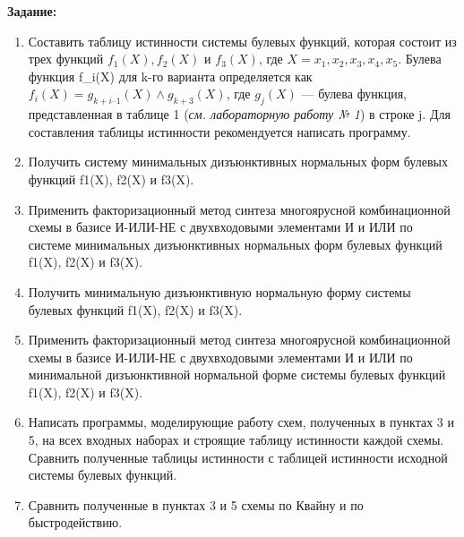 \textbf{Задание:}

\begin{enumerate}
\def\labelenumi{\arabic{enumi}.}
\tightlist
\item
  Составить таблицу истинности системы булевых функций, которая состоит
  из трех функций \(f_1(X), f_2(X)\) и \(f_3(X)\), где
  \(X = {x_1, x_2, x_3, x_4, x_5}\). Булева функция f\_i(X) для k-го
  варианта определяется как \(f_i(X) = g_{k+i–1}(X) \land g_{k+3}(X)\),
  где \(g_j(X)\) --- булева функция, представленная в таблице 1
  (\emph{см. лабораторную работу № 1}) в строке j. Для составления
  таблицы истинности рекомендуется написать программу.
\item
  Получить систему минимальных дизъюнктивных нормальных форм булевых
  функций f1(X), f2(X) и f3(X).
\item
  Применить факторизационный метод синтеза многоярусной комбинационной
  схемы в базисе И-ИЛИ-НЕ с двухвходовыми элементами И и ИЛИ по системе
  минимальных дизъюнктивных нормальных форм булевых функций f1(X), f2(X)
  и f3(X).
\item
  Получить минимальную дизъюнктивную нормальную форму системы булевых
  функций f1(X), f2(X) и f3(X).
\item
  Применить факторизационный метод синтеза многоярусной комбинационной
  схемы в базисе И-ИЛИ-НЕ с двухвходовыми элементами И и ИЛИ по
  минимальной дизъюнктивной нормальной форме системы булевых функций
  f1(X), f2(X) и f3(X).
\item
  Написать программы, моделирующие работу схем, полученных в пунктах 3 и
  5, на всех входных наборах и строящие таблицу истинности каждой схемы.
  Сравнить полученные таблицы истинности с таблицей истинности исходной
  системы булевых функций.
\item
  Сравнить полученные в пунктах 3 и 5 схемы по Квайну и по
  быстродействию.
\end{enumerate}
